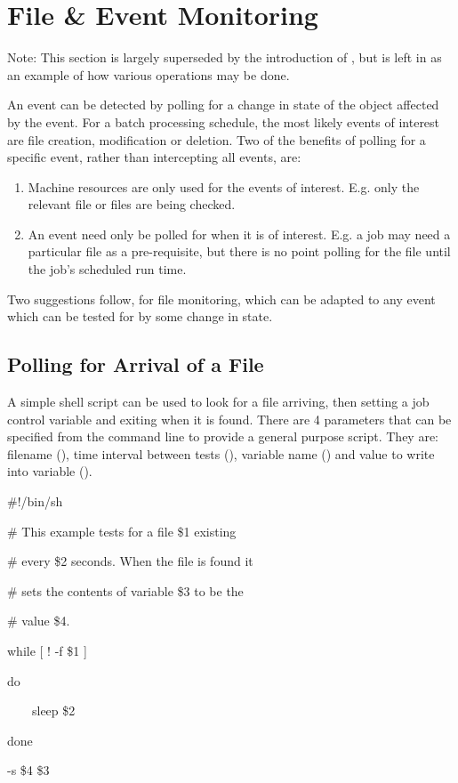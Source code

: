 \section{File \& Event Monitoring}
Note: This section is largely superseded by the introduction of \PrBtfilemon{}, but is left in as an example of how
various operations may be done.

An event can be detected by polling for a change in state of the object affected by the event. For a batch processing schedule, the most likely
events of interest are file creation, modification or deletion. Two of the benefits of polling for a specific event, rather than intercepting
all events, are:

\begin{enumerate}
\item Machine resources are only used for the events of interest. E.g. only the relevant file or files are being checked.
\item An event need only be polled for when it is of interest. E.g. a job may need a particular file as a pre-requisite, but there is no
point polling for the file until the job's scheduled run time.
\end{enumerate}
Two suggestions follow, for file monitoring, which can be adapted to any event which can be tested for by some change in state.

\subsection{Polling for Arrival of a File}
A simple shell script can be used to look for a file arriving, then setting a job control variable and exiting when it is found. There are
4 parameters that can be specified from the command line to provide a general purpose script. They are: filename
(), time interval between tests
(), variable name
() and value to write into variable
().

\begin{expara}

\#!/bin/sh

\# This example tests for a file \$1 existing

\# every \$2 seconds. When the file is found it

\# sets the contents of variable \$3 to be the

\# value \$4.

\bigskip


while [ ! -f \$1 ]

do

\ \ \ \ sleep \$2

done

\bigskip


\BtvarName{} -s \$4 \$3

\end{expara}

